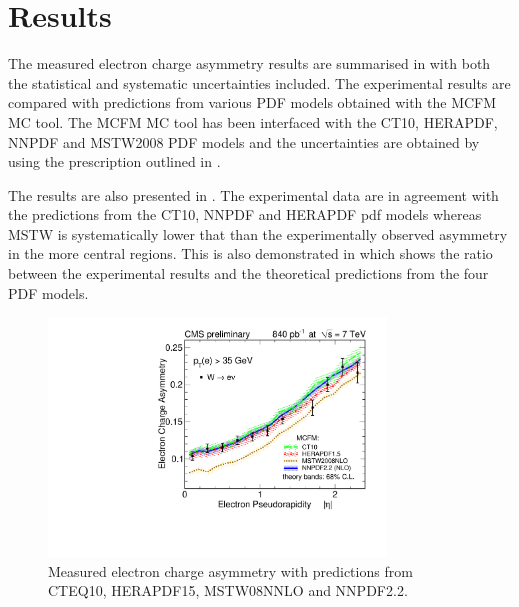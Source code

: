 \section{Results}
The measured electron charge asymmetry results are summarised in
 with both the statistical and systematic
uncertainties included. The experimental results are compared with predictions
from various PDF models obtained with the MCFM\cite{campbellmcfm} MC tool.  The
MCFM MC tool has been interfaced with the CT10\cite{lai2010vv},
HERAPDF\cite{aaron2010combined}, NNPDF\cite{Lionetti:2011pw} and
MSTW2008\cite{martin2009parton} PDF models and  the uncertainties are obtained
by using the prescription outlined in .

The results are also presented in . The experimental
data are in agreement with the predictions from the CT10, NNPDF and HERAPDF pdf
models whereas MSTW is systematically lower that than the experimentally
observed asymmetry in the more central regions. This is also demonstrated in
 which shows the ratio between the experimental results
and the theoretical predictions from the four PDF models.

\begin{figure}[htbp]
  \begin{center}
\includegraphics*[width=0.80\textwidth]{updated_asym}
  \caption[Measured electron charge asymmetry with predictions from CTEQ10,
HERAPDF15, MSTW08NNLO and NNPDF2.2.]{\label{fig:updated_asym} Measured electron
charge asymmetry with predictions from CTEQ10, HERAPDF15, MSTW08NNLO and
NNPDF2.2.}
  \end{center}
\end{figure}

